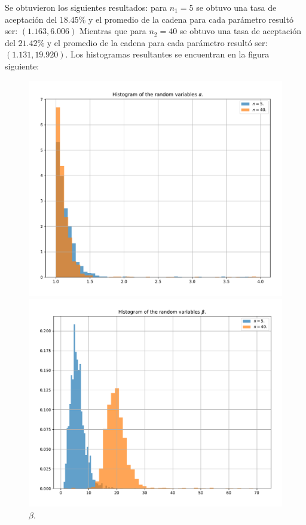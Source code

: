 Se obtuvieron los siguientes resultados: para $n_1=5$ se obtuvo una tasa de aceptación del $18.45\%$ y el promedio de la cadena para cada parámetro resultó ser: $(1.163, 6.006)$ Mientras que para $n_2=40$ se obtuvo una tasa de aceptación del $21.42\%$ y el promedio de la cadena para cada parámetro resultó ser: $(1.131, 19.920)$. Los histogramas resultantes se encuentran en la figura siguiente:
\begin{figure}[h]
	\centering
	\begin{minipage}{0.495\textwidth}
		\centering
		\includegraphics[width=\textwidth]{IMAGENES/ex1/histogram_n5.pdf}
		\caption{$\alpha$.}
	\end{minipage}
	\hfill
	\begin{minipage}{0.495\textwidth}
		\centering
		\includegraphics[width=\textwidth]{IMAGENES/ex1/histogram_n40.pdf}
		\caption{$\beta$.}
	\end{minipage}
\end{figure}

